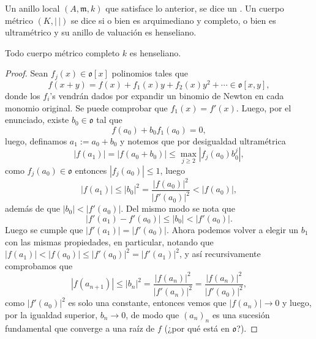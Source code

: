 \documentclass[teoria-numeros.tex]{subfiles}
\begin{document}
\begin{mydef}
	Un anillo local $(A, \mathfrak{m}, k)$ que satisface lo anterior, se dice un .
	Un cuerpo métrico $(K, |\,|)$ se dice  si o bien es arquimediano y completo, o bien es ultramétrico
	y su anillo de valuación es henseliano.
\end{mydef}

\begin{thmi}
	Todo cuerpo métrico completo $k$ es henseliano.
\end{thmi}
\begin{proof}
	Sean $f_j(x) \in \mathfrak{o}[x]$ polinomios tales que
	$$ f(x + y) = f(x) + f_1(x)y + f_2(x)y^2 + \cdots \in \mathfrak{o}[x, y], $$
	donde los $f_i$'s vendrán dados por expandir un binomio de Newton en cada monomio original.
	Se puede comprobar que $f_1(x) = f'(x)$.
	Luego, por el enunciado, existe $b_0 \in \mathfrak{o}$ tal que
	$$ f(a_0) + b_0 f_1(a_0) = 0, $$
	luego, definamos $a_1 := a_0 + b_0$ y notemos que por desigualdad ultramétrica
	$$ |f(a_1)| = |f(a_0 + b_0)| \le \max_{j\ge 2} |f_j(a_0) b_0^j|, $$
	como $f_j(a_0) \in \mathfrak{o}$ entonces $|f_j(a_0)| \le 1$, luego
	$$ |f(a_1)| \le |b_0|^2 = \frac{|f(a_0)|^2}{|f'(a_0)|^2} < |f(a_0)|, $$
	además de que $|b_0| < |f'(a_0)|$.
	Del mismo modo se nota que
	$$ |f'(a_1) - f'(a_0)| \le |b_0| < |f'(a_0)|. $$
	Luego se cumple que $|f'(a_1)| = |f'(a_0)|$.
	Ahora podemos volver a elegir un $b_1$ con las mismas propiedades, en particular, notando que $|f(a_1)| < |f(a_0)| \le |f'(a_0)|^2 = |f'(a_1)|^2$,
	y así recursivamente comprobamos que
	$$ |f(a_{n+1})| \le |b_n|^2 = \frac{|f(a_n)|^2}{|f'(a_n)|^2} = \frac{|f(a_n)|^2}{|f'(a_0)|^2}, $$
	como $|f'(a_0)|^2$ es solo una constante, entonces vemos que $|f(a_n)| \to 0$ y luego, por la igualdad superior, $b_n \to 0$, de modo que $(a_n)_n$
	es una sucesión fundamental que converge a una raíz de $f$ (¿por qué está en $\mathfrak{o}$?).
\end{proof}
\end{document}
